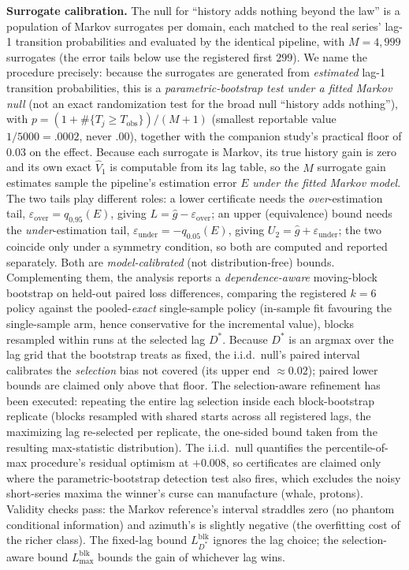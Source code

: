 \documentclass[11pt]{article}
\begin{document}
\textbf{Surrogate calibration.} The null for ``history adds nothing beyond
the law'' is a population of Markov surrogates per domain, each matched
to the real series' lag-1 transition probabilities and evaluated by the
identical pipeline, with $M=4{,}999$ surrogates (the error tails below use the registered
first $299$). We name the procedure
precisely: because the surrogates are generated from \emph{estimated}
lag-1 transition probabilities, this is a \emph{parametric-bootstrap test
under a fitted Markov null} (not an exact randomization test for the
broad null ``history adds nothing''), with
$p=(1+\#\{T_j\ge T_{\mathrm{obs}}\})/(M+1)$ (smallest reportable value
$1/5000=.0002$, never $.00$), together with the
companion study's practical floor of $0.03$ on the effect. Because each
surrogate is Markov, its true history gain is zero and its own exact
$\widehat V_1$ is computable from its lag table, so the $M$ surrogate gain
estimates sample the pipeline's estimation error $E$ \emph{under the
fitted Markov model}. The two tails play different roles: a lower
certificate needs the \emph{over}-estimation tail,
$\varepsilon_{\mathrm{over}}=q_{0.95}(E)$, giving
$L=\hat g-\varepsilon_{\mathrm{over}}$; an upper (equivalence) bound needs
the \emph{under}-estimation tail,
$\varepsilon_{\mathrm{under}}=-q_{0.05}(E)$, giving
$U_2=\hat g+\varepsilon_{\mathrm{under}}$; the two coincide only under a
symmetry condition, so both are computed and reported separately. Both
are \emph{model-calibrated} (not distribution-free) bounds. Complementing
them, the analysis reports a \emph{dependence-aware} moving-block
bootstrap on held-out paired loss differences, comparing the registered $k{=}6$
policy against the pooled-\emph{exact} single-sample policy (in-sample
fit favouring the single-sample arm, hence conservative for the
incremental value), blocks resampled within runs at the selected lag
$D^*$. Because $D^*$ is an argmax over the lag grid that the bootstrap
treats as fixed, the i.i.d.\ null's paired interval calibrates the
\emph{selection} bias not covered (its upper end $\approx0.02$); paired
lower bounds are claimed only above that floor. The selection-aware
refinement has been executed: repeating the entire lag selection inside
each block-bootstrap replicate (blocks resampled with shared starts
across all registered lags, the maximizing lag re-selected per replicate,
the one-sided bound taken from the resulting max-statistic distribution).
The i.i.d.\ null quantifies the percentile-of-max procedure's residual
optimism at $+0.008$, so certificates are claimed only where the
parametric-bootstrap detection test also fires, which excludes the
noisy short-series maxima the winner's curse can manufacture (whale,
protons). Validity checks pass:
the Markov reference's interval straddles zero (no phantom conditional
information) and azimuth's is slightly negative (the overfitting cost of
the richer class). The fixed-lag bound $L^{\mathrm{blk}}_{D^*}$ ignores
the lag choice; the selection-aware bound $L^{\mathrm{blk}}_{\max}$ bounds
the gain of whichever lag wins.
\end{document}
